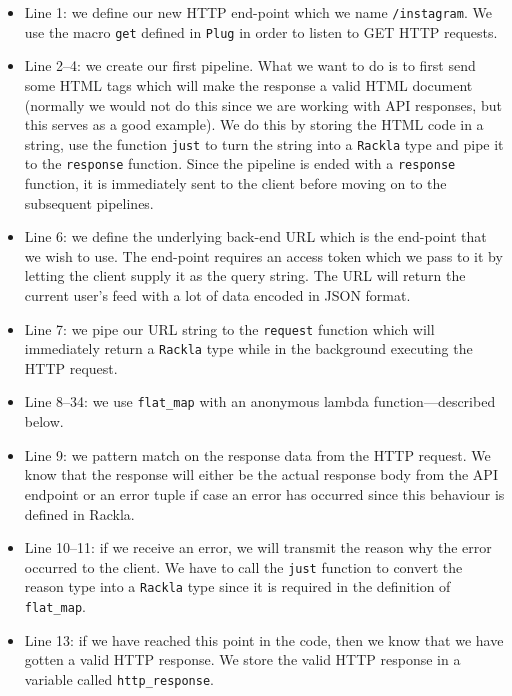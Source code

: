 \documentclass{cslthse-msc}
\begin{document}
\begin{itemize}

\item Line 1: we define our new HTTP end-point which we name \lstinline{/instagram}. We use the macro \lstinline{get} defined in \lstinline{Plug} in order to listen to GET HTTP requests.

\item Line 2--4: we create our first pipeline. What we want to do is to first send some HTML tags which will make the response a valid HTML document (normally we would not do this since we are working with API responses, but this serves as a good example). We do this by storing the HTML code in a string, use the function \lstinline{just} to turn the string into a \lstinline{Rackla} type and pipe it to the \lstinline{response} function. Since the pipeline is ended with a \lstinline{response} function, it is immediately sent to the client before moving on to the subsequent pipelines.

\item Line 6: we define the underlying back-end URL which is the end-point that we wish to use. The end-point requires an access token which we pass to it by letting the client supply it as the query string. The URL will return the current user's feed with a lot of data encoded in JSON format.

\item Line 7: we pipe our URL string to the \lstinline{request} function which will immediately return a \lstinline{Rackla} type while in the background executing the HTTP request.

\item Line 8--34: we use \lstinline{flat_map} with an anonymous lambda function---described below.

\item Line 9: we pattern match on the response data from the HTTP request. We know that the response will either be the actual response body from the API endpoint or an error tuple if case an error has occurred since this behaviour is defined in Rackla.

\item Line 10--11: if we receive an error, we will transmit the reason why the error occurred to the client. We have to call the \lstinline{just} function to convert the reason type into a \lstinline{Rackla} type since it is required in the definition of \lstinline{flat_map}.

\item Line 13: if we have reached this point in the code, then we know that we have gotten a valid HTTP response. We store the valid HTTP response in a variable called \lstinline{http_response}.


\end{itemize}
\end{document}
